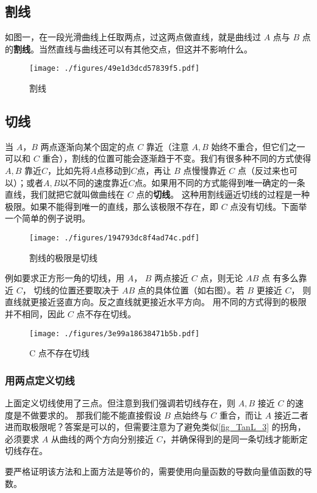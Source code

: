 


\subsection{割线}
如图一，在一段光滑曲线上任取两点，过这两点做直线，就是曲线过 $A$ 点与 $B$ 点的\textbf{割线}。当然直线与曲线还可以有其他交点，但这并不影响什么。
\begin{figure}[ht]
\centering
\texttt{[image: ./figures/49e1d3dcd57839f5.pdf]}
\caption{割线} \label{fig_TanL_1}
\end{figure}

\subsection{切线}
当 $A$，$B$ 两点逐渐向某个固定的点 $C$ 靠近（注意 $A,B$ 始终不重合，但它们之一可以和 $C$ 重合），割线的位置可能会逐渐趋于不变。我们有很多种不同的方式使得 $A, B$ 靠近$C$，比如先将$A$点移动到$C$点，再让 $B$ 点慢慢靠近 $C$ 点（反过来也可以）；或者$A, B$以不同的速度靠近$C$点。如果用不同的方式能得到唯一确定的一条直线，我们就把它就叫做曲线在 $C$ 点的\textbf{切线}。 这种用割线逼近切线的过程是一种极限。如果不能得到唯一的直线，那么该极限不存在，即 $C$ 点没有切线。下面举一个简单的例子说明。

\begin{figure}[ht]
\vskip 0pt
\centering
\texttt{[image: ./figures/194793dc8f4ad74c.pdf]}
\caption{割线的极限是切线} \label{fig_TanL_2}
\end{figure}
例如要求正方形一角的切线，用
 $A$，  $B$ 两点接近 $C$ 点，则无论 $AB$ 点
有多么靠近 $C$， 切线的位置还要取决于 $AB$ 点的具体位置（如右图）。若 $B$ 更接近 $C$， 则直线就更接近竖直方向。反之直线就更接近水平方向。 用不同的方式得到的极限并不相同，因此 $C$ 点不存在切线。

\begin{figure}[ht]
\centering
\texttt{[image: ./figures/3e99a18638471b5b.pdf]}
\caption{C 点不存在切线} \label{fig_TanL_3}
\end{figure}

\subsubsection{用两点定义切线}
上面定义切线使用了三点。但注意到我们强调若切线存在，则 $A,B$ 接近 $C$ 的速度是不做要求的。 那我们能不能直接假设 $B$ 点始终与 $C$ 重合，而让 $A$ 接近二者进而取极限呢？答案是可以的，但需要注意为了避免类似\autoref{fig_TanL_3} 的拐角，必须要求 $A$ 从曲线的两个方向分别接近 $C$，并确保得到的是同一条切线才能断定切线存在。

要严格证明该方法和上面方法是等价的，需要使用向量函数的导数向量值函数的导数。
